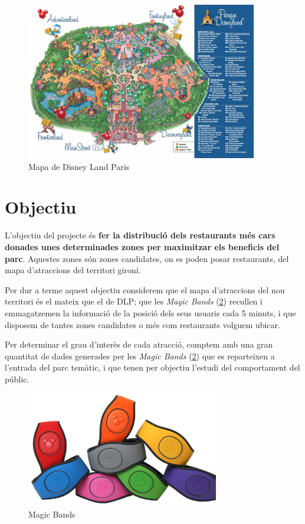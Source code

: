 \documentclass[12pt]{article}
\begin{document}
\begin{figure}[h!]
    \centering
    \includegraphics[width=0.90\textwidth]{imatges/mapa_disney_land_paris.jpg}\par\vspace{1cm}
    \caption{Mapa de Disney Land Paris}
    \label{fig:disney1}
\end{figure}

\clearpage
\section{Objectiu}
L'objectiu del projecte és \textbf{fer la distribució dels restaurants més cars donades unes determinades zones per maximitzar els beneficis del parc}. Aquestes zones són zones candidates, on es poden posar restaurants, del mapa d'atraccions del territori gironí.

Per dur a terme aquest objectiu considerem que el mapa d'atraccions del nou territori és el mateix que el de DLP; que les \textit{Magic Bands} (\ref{fig:magic_bands}) recullen i emmagatzemen la informació de la posició dels seus usuaris cada 5 minuts, i que disposem de tantes zones candidates o més com restaurants volguem ubicar. 

Per determinar el grau d'interès de cada atracció, comptem amb una gran quantitat de dades generades per les \textit{Magic Bands} (\ref{fig:magic_bands}) que es reparteixen a l'entrada del parc temàtic, i que tenen per objectiu l'estudi del comportament del públic. 

\begin{figure}[h]
    \centering
    \includegraphics[width=0.75\textwidth]{imatges/magic_bands.jpg}\par\vspace{1cm}
    \caption{Magic Bands}
    \label{fig:magic_bands}
\end{figure}
\end{document}
